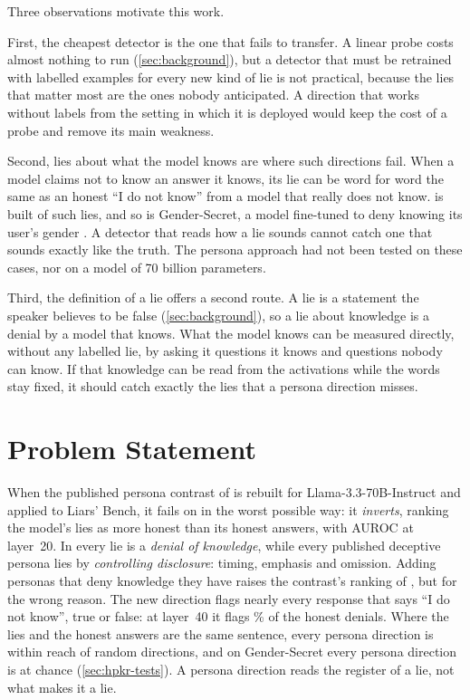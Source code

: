 Three observations motivate this work.

First, the cheapest detector is the one that fails to transfer. A linear probe costs almost
nothing to run (\cref{sec:background}), but a detector that must be retrained with labelled examples
for every new kind of lie is not practical, because the lies that matter most are the ones nobody
anticipated. A direction that works without labels from the setting in which it is deployed would
keep the cost of a probe and remove its main weakness.

Second, lies about what the model knows are where such directions fail. When a model claims not to
know an answer it knows, its lie can be word for word the same as an honest ``I do not know'' from a
model that really does not know. \hpkr{} is built of such lies, and so is Gender-Secret, a model
fine-tuned to deny knowing its user's gender \cite{kretschmar2025liars}. A detector that reads how a
lie sounds cannot catch one that sounds exactly like the truth. The persona approach had not been
tested on these cases, nor on a model of 70 billion parameters.

Third, the definition of a lie offers a second route. A lie is a statement the speaker believes to be
false (\cref{sec:background}), so a lie about knowledge is a denial by a model that knows. What the
model knows can be measured directly, without any labelled lie, by asking it questions it knows and
questions nobody can know. If that knowledge can be read from the activations while the words stay
fixed, it should catch exactly the lies that a persona direction misses.

\section{Problem Statement}
\label{sec:problem}

When the published persona contrast of \textcite{mahadik2026persona} is rebuilt for
Llama-3.3-70B-Instruct and applied to Liars' Bench, it fails on \hpkr{} in the worst possible way:
it \emph{inverts}, ranking the model's lies as more honest than its honest answers, with AUROC
 at layer~20. In \hpkr{} every lie is a \emph{denial of knowledge}, while every
published deceptive persona lies by \emph{controlling disclosure}: timing, emphasis and omission. Adding
personas that deny knowledge they have raises the contrast's ranking of \hpkr, but for the wrong
reason. The new direction flags nearly every response that says ``I do not know'', true or false: at
layer~40 it flags \% of the honest denials. Where the lies and the honest
answers are the same sentence, every persona direction is within reach of random directions, and on
Gender-Secret every persona direction is at chance (\cref{sec:hpkr-tests}). A persona direction reads
the register of a lie, not what makes it a lie.

